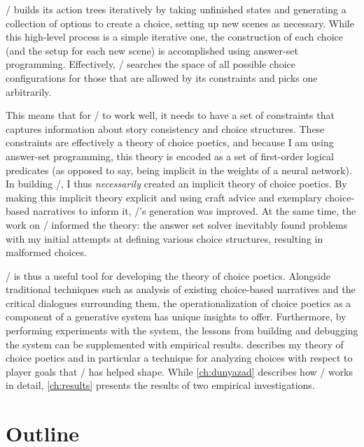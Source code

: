\dunyazad/ builds its action trees iteratively by taking unfinished states and generating a collection of options to create a choice, setting up new scenes as necessary.
%
While this high-level process is a simple iterative one, the construction of each choice (and the setup for each new scene) is accomplished using answer-set programming.
%
Effectively, \dunyazad/ searches the space of all possible choice configurations for those that are allowed by its constraints and picks one arbitrarily.


This means that for \dunyazad/ to work well, it needs to have a set of constraints that captures information about story consistency and choice structures.
%
These constraints are effectively a theory of choice poetics, and because I am using answer-set programming, this theory is encoded as a set of first-order logical predicates (as opposed to say, being implicit in the weights of a neural network).
%
In building \dunyazad/, I thus \emph{necessarily} created an implicit theory of choice poetics.
%
By making this implicit theory explicit and using craft advice and exemplary choice-based narratives to inform it, \dunyazad/'s generation was improved.
%
At the same time, the work on \dunyazad/ informed the theory: the answer set solver inevitably found problems with my initial attempts at defining various choice structures, resulting in malformed choices.


\dunyazad/ is thus a useful tool for developing the theory of choice poetics.
%
Alongside traditional techniques such as analysis of existing choice-based narratives and the critical dialogues surrounding them, the operationalization of choice poetics as a component of a generative system has unique insights to offer.
%
Furthermore, by performing experiments with the system, the lessons from building and debugging the system can be supplemented with empirical results.
%
 describes my theory of choice poetics and in particular a technique for analyzing choices with respect to player goals that \dunyazad/ has helped shape.
%
While \cref{ch:dunyazad} describes how \dunyazad/ works in detail, \cref{ch:results} presents the results of two empirical investigations.



\section{Outline}

